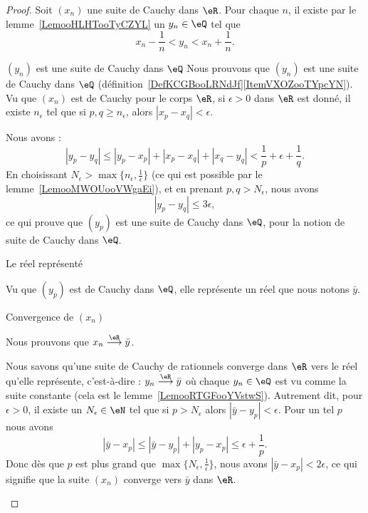 \begin{proof}
    Soit \( (x_n)\) une suite de Cauchy dans \( \eR\). Pour chaque \( n\), il existe par le lemme~\ref{LemooHLHTooTyCZYL} un \( y_n\in \eQ\) tel que
    \begin{equation}
        x_n-\frac{1}{ n }<y_n<x_n+\frac{1}{ n }.
    \end{equation}
    \begin{subproof}
        \item[\( (y_n)\) est une suite de Cauchy dans \( \eQ\)]
            Nous prouvons que \( (y_n)\) est une suite de Cauchy dans \( \eQ\) (définition~\ref{DefKCGBooLRNdJf}\ref{ItemVXOZooTYpcYN}). Vu que \( (x_n)\) est de Cauchy pour le corps \( \eR\), si \( \epsilon>0\) dans \( \eR\) est donné, il existe \( n_{\epsilon}\) tel que si \( p,q\geq n_{\epsilon}\), alors \( | x_p-x_q |<\epsilon\).

        Nous avons :
        \begin{equation}
            | y_p-y_q |\leq | y_p-x_p |+| x_p-x_q |+| x_q-y_q |<\frac{1}{ p }+\epsilon+\frac{1}{ q }.
        \end{equation}
        En choisissant \( N_{\epsilon}>\max\{ n_{\epsilon},\frac{1}{ \epsilon } \}\) (ce qui est possible par le lemme~\ref{LemooMWOUooVWgaEi}), et en prenant \( p,q>N_{\epsilon}\), nous avons
        \begin{equation}
            | y_p-y_q |\leq 3\epsilon,
        \end{equation}
        ce qui prouve que \( (y_p)\) est une suite de Cauchy dans \( \eQ\), pour la notion de suite de Cauchy dans \( \eQ\).

    \item[Le réel représenté]

        Vu que \( (y_p)\) est de Cauchy dans \( \eQ\), elle représente un réel que nous notons \( \bar y\).

    \item[Convergence de \( (x_n)\)]

        Nous prouvons que \(     x_n\stackrel{\eR}{\longrightarrow}\bar y \).

        Nous savons qu'une suite de Cauchy de rationnels converge dans \( \eR\) vers le réel qu'elle représente, c'est-à-dire : \( y_n\stackrel{\eR}{\longrightarrow}\bar y\) où chaque \( y_n\in \eQ\) est vu comme la suite constante (cela est le lemme~\ref{LemooRTGFooYVstwS}). Autrement dit, pour \( \epsilon>0\), il existe un \( N_{\epsilon}\in \eN\) tel que si \( p>N_{\epsilon}\) alors \( | \bar y-y_p |<\epsilon\). Pour un tel \( p\) nous avons
        \begin{equation}
            | \bar y-x_p |\leq| \bar y-y_p |+| y_p-x_p |\leq \epsilon+\frac{1}{ p }.
        \end{equation}
        Donc dès que \( p\) est plus grand que \( \max\{ N_{\epsilon},\frac{1}{ \epsilon } \}\), nous avons \( | \bar y-x_p |<2\epsilon\), ce qui signifie que la suite \( (x_n) \) converge vers \( \bar y\) dans \( \eR\).


\end{subproof}
\end{proof}
